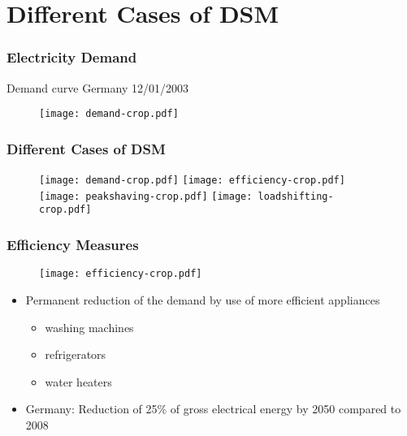 \documentclass[10pt,dvipsnames]{beamer}
\let\olditem\item
\renewcommand{\item}{%
\olditem\vspace{5pt}}
\begin{document}
\section{Different Cases of DSM}
\begin{frame}
 \frametitle{Electricity Demand}

 Demand curve Germany 12/01/2003
   \begin{figure}
     \texttt{[image: demand-crop.pdf]}
  \end{figure}

\end{frame}
\begin{frame}
 \frametitle{Different Cases of DSM}
   \begin{figure}
     \texttt{[image: demand-crop.pdf]} \texttt{[image: efficiency-crop.pdf]}\\
      \texttt{[image: peakshaving-crop.pdf]} \texttt{[image: loadshifting-crop.pdf]}
  \end{figure}

\end{frame}
\begin{frame}
 \frametitle{Efficiency Measures}
 \begin{minipage}[t]{0.5\textwidth}
    \begin{figure}
  \texttt{[image: efficiency-crop.pdf]}
  \end{figure}
\end{minipage}\hfill
\begin{minipage}[t]{0.5\textwidth}
\begin{itemize}
 \item Permanent reduction of the demand by use of more efficient appliances
 \begin{itemize}
 \item washing machines
 \item refrigerators
 \item water heaters
 \end{itemize}
 \item Germany: Reduction of 25\% of gross electrical energy by 2050 compared to 2008
\end{itemize}

\end{minipage}


\end{frame}
\end{document}
